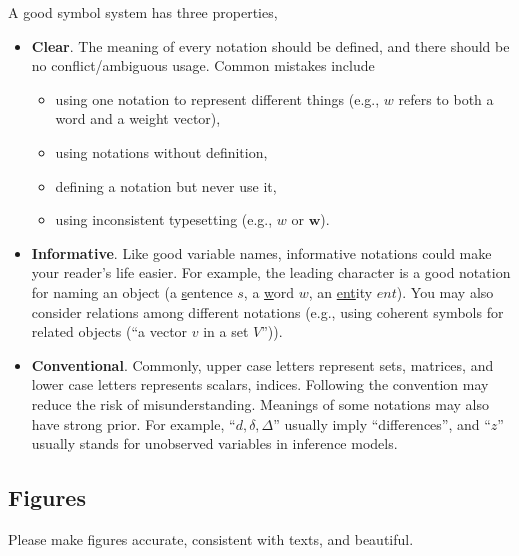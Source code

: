 A good symbol system has three properties,
\begin{itemize}
    \item \textbf{Clear}. The meaning of every notation should be defined, 
        and there should be no conflict/ambiguous usage. Common mistakes include 
        \begin{itemize}
            \item using one notation to represent different things 
                (e.g., $w$ refers to both a word and a weight vector),
            \item using notations without definition,
            \item defining a notation but never use it,
            \item using inconsistent typesetting (e.g., $w$ or $\mathbf{w}$).
        \end{itemize}
    \item \textbf{Informative}. Like good variable names,
        informative notations could make your reader's life easier. 
        For example, the leading character is a good notation for naming an object 
        (a \underline{s}entence $s$, a \underline{w}ord $w$, an \underline{ent}ity $ent$).
        You may also consider relations among different notations
        (e.g., using coherent symbols for related objects (``a vector $v$ in a set $V$'')).
    \item \textbf{Conventional}. Commonly, upper case letters represent sets, matrices, 
        and lower case letters represents scalars, indices. Following the convention
        may reduce the risk of misunderstanding.
        Meanings of some notations may also have strong prior.
        For example, ``$d, \delta, \Delta$'' usually imply ``differences'', and
        ``$z$'' usually stands for unobserved variables in inference models.
\end{itemize}

\subsection{Figures}
Please make figures accurate, consistent with texts, and beautiful.




